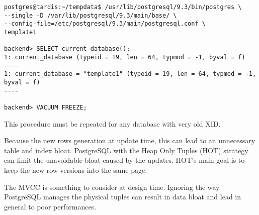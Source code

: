 \begin{verbatim}
postgres@tardis:~/tempdata$ /usr/lib/postgresql/9.3/bin/postgres \
--single -D /var/lib/postgresql/9.3/main/base/ \
--config-file=/etc/postgresql/9.3/main/postgresql.conf \
template1

backend> SELECT current_database();
1: current_database (typeid = 19, len = 64, typmod = -1, byval = f)
----
1: current_database = "template1" (typeid = 19, len = 64, typmod = -1, byval = f)
----

backend> VACUUM FREEZE;
\end{verbatim}

This procedure must be repeated for any database with very old XID.\newline

Because the new rows generation at update time, this can lead to an unnecessary table and index bloat.
PostgreSQL with the Heap Only Tuples (HOT)\index{HOT strategy} strategy can limit the unavoidable bloat
caused by the updates. HOT's main goal is to keep the new row versions into the same page.

The MVCC is something to consider at design time. Ignoring the way PostgreSQL manages the physical tuples
can result in data bloat and lead in general to poor performances.
